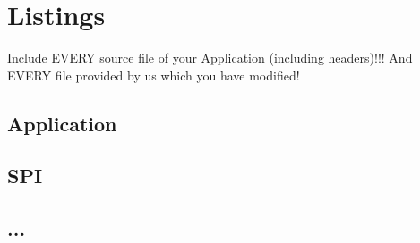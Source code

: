 \section{Listings}
\small{

Include EVERY source file of your Application (including headers)!!!
And EVERY file provided by us which you have modified!

\subsection{Application}




\subsection{SPI}


\subsection{...}



}%
